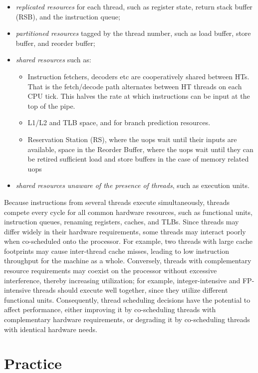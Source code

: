 \documentclass[12pt]{article}
\begin{document}
\begin{itemize}
	\item {\em replicated resources} for each thread, such as register state, return stack buffer (RSB), and the instruction queue; 
    \item {\em partitioned resources} tagged by the thread number, such as load buffer, store buffer, and reorder buffer;
    \item {\em shared resources} such as:
    \begin{itemize}
    		\item Instruction fetchers, decoders etc are cooperatively shared between HTs. That is the fetch/decode path alternates between HT threads on each CPU tick. This halves the rate at which instructions can be input at the top of the pipe.
    		\item L1/L2 and TLB space, and for branch prediction resources.
    		\item Reservation Station (RS), where the uops wait until their inputs are available, space in the Reorder Buffer, where the uops wait until they can be retired sufficient load and store buffers in the case of memory related uops
    \end{itemize}
    \item {\em shared resources unaware of the presence of threads}, such as execution units.
\end{itemize}

Because instructions from several threads execute simultaneously, threads compete every cycle for all common hardware resources, such as functional units, instruction queues, renaming registers, caches, and TLBs. Since threads may differ widely in their hardware requirements, some threads may interact poorly when co-scheduled onto the processor. For example, two threads with large cache footprints may cause inter-thread cache misses, leading to low instruction throughput for the machine as a whole. Conversely, threads with complementary resource requirements may coexist on the processor without excessive interference, thereby increasing utilization; for example, integer-intensive and FP-intensive threads should execute well together, since they utilize different functional units. Consequently, thread scheduling decisions have the potential to affect performance, either improving it by co-scheduling threads with complementary hardware requirements, or degrading it by co-scheduling threads with identical hardware needs\cite{smt}.

\section{Practice}
\end{document}
